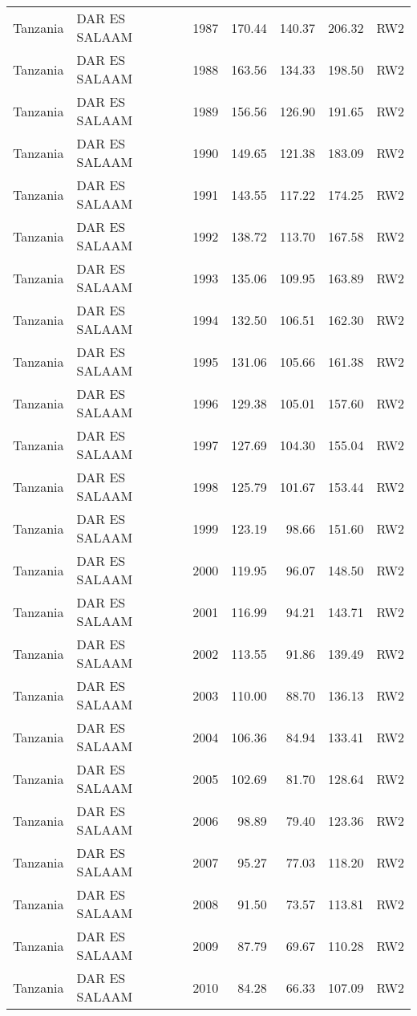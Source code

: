 \begin{longtable}{lllrrrl}
  Tanzania & DAR ES SALAAM & 1987 & 170.44 & 140.37 & 206.32 & RW2 \\ 
  Tanzania & DAR ES SALAAM & 1988 & 163.56 & 134.33 & 198.50 & RW2 \\ 
  Tanzania & DAR ES SALAAM & 1989 & 156.56 & 126.90 & 191.65 & RW2 \\ 
  Tanzania & DAR ES SALAAM & 1990 & 149.65 & 121.38 & 183.09 & RW2 \\ 
  Tanzania & DAR ES SALAAM & 1991 & 143.55 & 117.22 & 174.25 & RW2 \\ 
  Tanzania & DAR ES SALAAM & 1992 & 138.72 & 113.70 & 167.58 & RW2 \\ 
  Tanzania & DAR ES SALAAM & 1993 & 135.06 & 109.95 & 163.89 & RW2 \\ 
  Tanzania & DAR ES SALAAM & 1994 & 132.50 & 106.51 & 162.30 & RW2 \\ 
  Tanzania & DAR ES SALAAM & 1995 & 131.06 & 105.66 & 161.38 & RW2 \\ 
  Tanzania & DAR ES SALAAM & 1996 & 129.38 & 105.01 & 157.60 & RW2 \\ 
  Tanzania & DAR ES SALAAM & 1997 & 127.69 & 104.30 & 155.04 & RW2 \\ 
  Tanzania & DAR ES SALAAM & 1998 & 125.79 & 101.67 & 153.44 & RW2 \\ 
  Tanzania & DAR ES SALAAM & 1999 & 123.19 & 98.66 & 151.60 & RW2 \\ 
  Tanzania & DAR ES SALAAM & 2000 & 119.95 & 96.07 & 148.50 & RW2 \\ 
  Tanzania & DAR ES SALAAM & 2001 & 116.99 & 94.21 & 143.71 & RW2 \\ 
  Tanzania & DAR ES SALAAM & 2002 & 113.55 & 91.86 & 139.49 & RW2 \\ 
  Tanzania & DAR ES SALAAM & 2003 & 110.00 & 88.70 & 136.13 & RW2 \\ 
  Tanzania & DAR ES SALAAM & 2004 & 106.36 & 84.94 & 133.41 & RW2 \\ 
  Tanzania & DAR ES SALAAM & 2005 & 102.69 & 81.70 & 128.64 & RW2 \\ 
  Tanzania & DAR ES SALAAM & 2006 & 98.89 & 79.40 & 123.36 & RW2 \\ 
  Tanzania & DAR ES SALAAM & 2007 & 95.27 & 77.03 & 118.20 & RW2 \\ 
  Tanzania & DAR ES SALAAM & 2008 & 91.50 & 73.57 & 113.81 & RW2 \\ 
  Tanzania & DAR ES SALAAM & 2009 & 87.79 & 69.67 & 110.28 & RW2 \\ 
  Tanzania & DAR ES SALAAM & 2010 & 84.28 & 66.33 & 107.09 & RW2 \\ 

\end{longtable}
